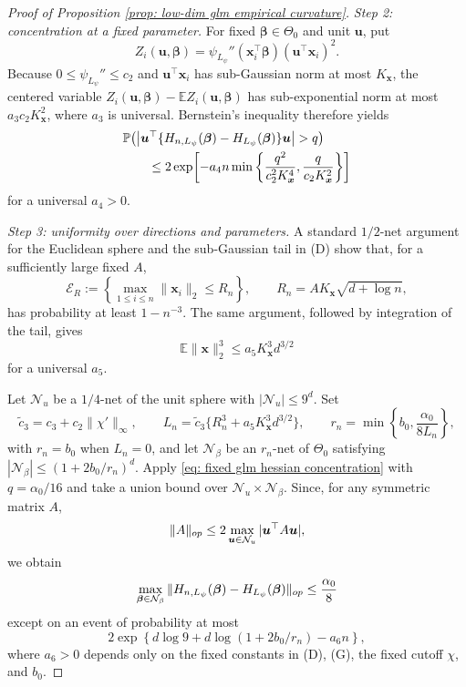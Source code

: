 \documentclass[letterpaper,12pt]{article}
\numberwithin{equation}{section}
\theoremstyle{plain}
\numberwithin{Theorem}{section}
\numberwithin{proposition}{section}
\numberwithin{Lemma}{section}
{
	\theoremstyle{definition}
	\newtheorem{Definition}{Definition}
	\newtheorem{example}{Example}
	\numberwithin{example}{section}
	\newtheorem{fact}{Fact}
	\numberwithin{fact}{section}
	\newtheorem{remark}{Remark}
}
\newcommand{\Pro}{\mathbb{P}}
\newcommand{\1}{\mathbbm{1}}
\def\bbeta{{\boldsymbol{\beta}}}
\def\E{\mathbb{E}}
\begin{document}
\begin{proof}[Proof of Proposition \ref{prop: low-dim glm empirical curvature}]
	\textit{Step 2: concentration at a fixed parameter.}
	For fixed $\bbeta\in\Theta_0$ and unit $\bm u$, put
	\[
	Z_i(\bm u,\bbeta)
	=\psi_{L_\psi}''(\bm x_i^\top\bbeta)(\bm u^\top\bm x_i)^2.
	\]
	Because $0\leq\psi_{L_\psi}''\leq c_2$ and
	$\bm u^\top\bm x_i$ has sub-Gaussian norm at most $K_{\bm x}$, the centered variable
	$Z_i(\bm u,\bbeta)-\E Z_i(\bm u,\bbeta)$ has sub-exponential norm at most $a_3c_2K_{\bm x}^2$, where $a_3$ is universal.  Bernstein's inequality therefore yields
	\begin{align}\label{eq: fixed glm hessian concentration}
	&\Pro\!\left(\left|\bm u^\top\{H_{n,L_\psi}(\bbeta)-H_{L_\psi}(\bbeta)\}\bm u\right|>q\right)\notag\\
	&\qquad\leq2\exp\!\left[-a_4n
	\min\left\{\frac{q^2}{c_2^2K_{\bm x}^4},
	\frac{q}{c_2K_{\bm x}^2}\right\}\right]
	\end{align}
	for a universal $a_4>0$.

	\textit{Step 3: uniformity over directions and parameters.}
	A standard $1/2$-net argument for the Euclidean sphere and the sub-Gaussian tail in (D) show that, for a sufficiently large fixed $A$,
	\begin{equation}\label{eq: glm design norm event}
	\mathcal E_R:=\left\{\max_{1\leq i\leq n}\|\bm x_i\|_2\leq
	R_n\right\},
	\qquad R_n=AK_{\bm x}\sqrt{d+\log n},
	\end{equation}
	has probability at least $1-n^{-3}$.  The same argument, followed by integration of the tail, gives
	\begin{equation}\label{eq: glm design third moment}
	\E\|\bm x\|_2^3\leq a_5K_{\bm x}^3d^{3/2}
	\end{equation}
	for a universal $a_5$.

	Let $\mathcal N_u$ be a $1/4$-net of the unit sphere with $|\mathcal N_u|\leq9^d$.  Set
	\[
	\widetilde c_3=c_3+c_2\|\chi'\|_\infty,
	\qquad
	L_n=\widetilde c_3\{R_n^3+a_5K_{\bm x}^3d^{3/2}\},
	\qquad
	r_n=\min\left\{b_0,\frac{\alpha_0}{8L_n}\right\},
	\]
	with $r_n=b_0$ when $L_n=0$, and let $\mathcal N_\beta$ be an $r_n$-net of $\Theta_0$ satisfying
	$|\mathcal N_\beta|\leq(1+2b_0/r_n)^d$.
	Apply \eqref{eq: fixed glm hessian concentration} with $q=\alpha_0/16$ and take a union bound over
	$\mathcal N_u\times\mathcal N_\beta$.  Since, for any symmetric matrix $A$,
	\[
	\|A\|_{\rm op}\leq2\max_{\bm u\in\mathcal N_u}|\bm u^\top A\bm u|,
	\]
	we obtain
	\begin{equation}\label{eq: glm hessian net event}
	\max_{\bbeta\in\mathcal N_\beta}
	\|H_{n,L_\psi}(\bbeta)-H_{L_\psi}(\bbeta)\|_{\rm op}
	\leq\frac{\alpha_0}{8}
	\end{equation}
	except on an event of probability at most
	\[
	2\exp\left\{d\log9+d\log(1+2b_0/r_n)-a_6n\right\},
	\]
	where $a_6>0$ depends only on the fixed constants in (D), (G), the
	fixed cutoff $\chi$, and $b_0$.


\end{proof}
\end{document}
